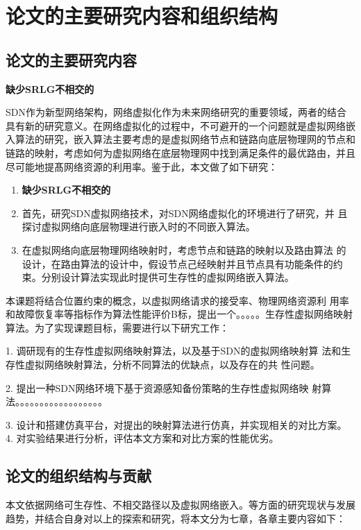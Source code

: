 \section{论文的主要研究内容和组织结构}
\subsection{论文的主要研究内容}
\textbf{缺少SRLG不相交的}

SDN作为新型网络架构，网络虚拟化作为未来网络研究的重要领域，两者的结合具有新的研究意义。在网络虚拟化的过程中，不可避开的一个问题就是虚拟网络嵌入算法的研究，嵌入算法主要考虑的是虚拟网络节点和链路向底层物理网的节点和链路的映射，考虑如何为虚拟网络在底层物理网中找到满足条件的最优路由，并且尽可能地提髙网络资源的利用率。鉴于此，本文做了如下研究：
\begin{enumerate}
  \item \textbf{缺少SRLG不相交的}
  \item 首先，研究SDN虚拟网络技术，对SDN网络虚拟化的环境进行了研究，并 且探讨虚拟网络向底层物理进行嵌入时的不同嵌入算法。

  \item 在虚拟网络向底层物理网络映射时，考虑节点和链路的映射以及路由算法 的设计，在路由算法的设计中，假设节点己经映射并且节点具有功能条件的约束。分别设计算法实现此时提供可生存性的虚拟网络嵌入算法。
\end{enumerate}


本课题将结合位置约束的概念，以虚拟网络请求的接受率、物理网络资源利 用率和故障恢复率等指标作为算法性能评价B标，提出一个。。。。。生存性虚拟网络映射算法。为了实现课题目标，需要进行以下研宄工作：

1.	调研现有的生存性虚拟网络映射算法，以及基于SDN的虚拟网络映射算 法和生存性虚拟网络映射算法，分析不同算法的优缺点，以及存在的共 性问题。

2.	提出一种SDN网络环境下基于资源感知备份策略的生存性虚拟网络映 射算法。。。。。。。。。。。。。。。。。。

3.	设计和搭建仿真平台，对提出的映射算法进行仿真，并实现相关的对比方案。
4.	对实验结果进行分析，评估本文方案和对比方案的性能优劣。


\subsection{论文的组织结构与贡献}
本文依据网络可生存性、不相交路径以及虚拟网络嵌入。等方面的研究现状与发展趋势，并结合自身对以上的探索和研究，将本文分为七章，各章主要内容如下：


